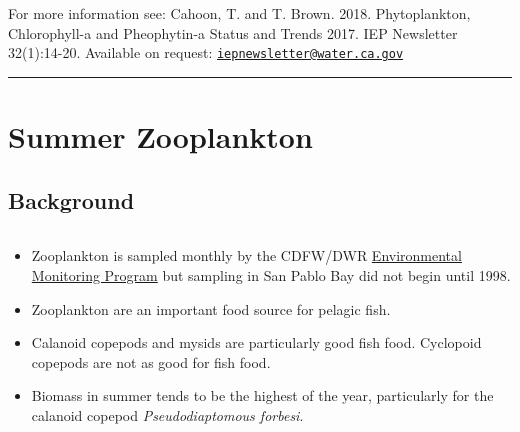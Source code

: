 \documentclass[
]{book}
\providecommand{\tightlist}{%
  \setlength{\itemsep}{0pt}\setlength{\parskip}{0pt}}
\begin{document}
\begin{disclaimer}
For more information see: Cahoon, T. and T. Brown. 2018. Phytoplankton,
Chlorophyll-a and Pheophytin-a Status and Trends 2017. IEP Newsletter
32(1):14-20. Available on request:
\href{mailto:iepnewsletter@water.ca.gov}{\nolinkurl{iepnewsletter@water.ca.gov}}
\end{disclaimer}

\begin{center}\rule{0.5\linewidth}{0.5pt}\end{center}

\hypertarget{summer-zooplankton}{%
\section{Summer Zooplankton}\label{summer-zooplankton}}

\hypertarget{background-9}{%
\subsection{Background}\label{background-9}}

\begin{column}{0.7\textwidth}
\begin{itemize}
\tightlist
\item
  Zooplankton is sampled monthly by the CDFW/DWR \href{https://emp.baydeltalive.com/wiki/12297}{Environmental Monitoring Program} but sampling in San Pablo Bay did not begin until 1998.
\item
  Zooplankton are an important food source for pelagic fish.
\item
  Calanoid copepods and mysids are particularly good fish food. Cyclopoid copepods are not as good for fish food.
\item
  Biomass in summer tends to be the highest of the year, particularly for the calanoid copepod \emph{Pseudodiaptomous forbesi}.
\end{itemize}
\end{column}
\end{document}
